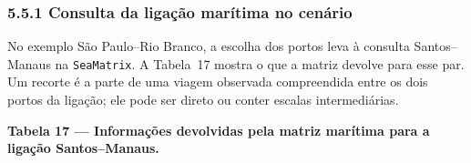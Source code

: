 \documentclass[brazil,]{article}
\let\oldsubsubsection\subsubsection
\renewcommand{\subsubsection}{\Needspace{10\baselineskip}\oldsubsubsection}
\newcommand{\keeptable}{\Needspace{0.64\textheight}}
\begin{document}
\hypertarget{consulta-da-ligauxe7uxe3o-maruxedtima-no-cenuxe1rio}{%
\subsubsection{5.5.1 Consulta da ligação marítima no
cenário}\label{consulta-da-ligauxe7uxe3o-maruxedtima-no-cenuxe1rio}}

No exemplo São Paulo--Rio Branco, a escolha dos portos leva à consulta
Santos--Manaus na \texttt{SeaMatrix}. A Tabela~17 mostra o que a matriz
devolve para esse par. Um recorte é a parte de uma viagem observada
compreendida entre os dois portos da ligação; ele pode ser direto ou
conter escalas intermediárias.

\keeptable
\textbf{Tabela 17 --- Informações devolvidas pela matriz marítima para a
ligação Santos--Manaus.}
\end{document}
